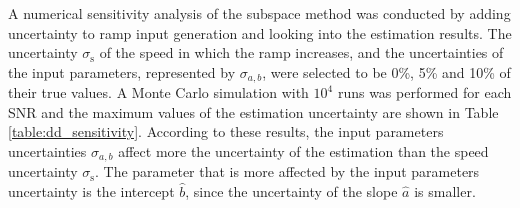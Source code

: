 A numerical sensitivity analysis of the subspace method was conducted by adding uncertainty to ramp input generation and looking into the estimation results. 
The uncertainty $\sigma_{\mathrm{s}}$ of the speed in which the ramp increases, and the uncertainties of the input parameters, represented by $\sigma_{a,b}$, were selected to be 0\%, 5\% and 10\% of their true values.
A Monte Carlo simulation with $10^4$ runs was performed for each SNR and the maximum values of the estimation uncertainty are shown in Table \ref{table:dd_sensitivity}. 
According to these results, the input parameters uncertainties $\sigma_{a,b}$ affect more the uncertainty of the estimation than the speed uncertainty $\sigma_{\mathrm{s}}$. 
The parameter that is more affected by the input parameters uncertainty is the intercept $\widehat{b}$, since the uncertainty of the slope $\widehat{a}$ is smaller.



